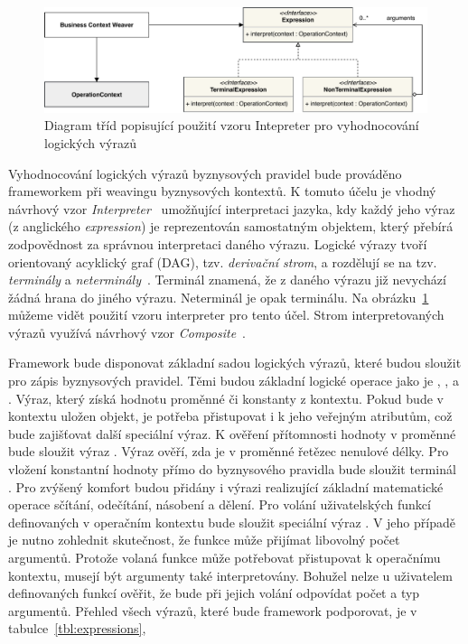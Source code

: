 \begin{figure}
    \centering
    \includegraphics[keepaspectratio=true, width=1\linewidth]{figures/expression.pdf}
    \caption{Diagram tříd popisující použití vzoru Intepreter pro vyhodnocování logických výrazů}
    \label{fig:expression}
\end{figure}

Vyhodnocování logických výrazů byznysových pravidel bude prováděno frameworkem
při weavingu byznysových kontextů. K tomuto účelu je vhodný návrhový vzor
\textit{Interpreter}~\cite{fowler2002patterns} umožňující interpretaci
jazyka, kdy každý jeho výraz (z anglického \textit{expression}) je reprezentován
samostatným objektem, který přebírá zodpovědnost za správnou interpretaci daného výrazu.
Logické výrazy tvoří orientovaný acyklický graf (\gls{DAG}), tzv. \textit{derivační strom},
a rozdělují se na tzv. \textit{terminály} a \textit{neterminály}~\cite{melichar2003jazyky}.
Terminál znamená, že z daného výrazu již nevychází žádná hrana do jiného výrazu. Neterminál je opak terminálu.
Na obrázku~\ref{fig:expression} můžeme vidět použití vzoru interpreter pro tento účel.
Strom interpretovaných výrazů využívá návrhový vzor \textit{Composite}~\cite{fowler2002patterns}.

Framework bude disponovat základní sadou logických výrazů, které budou
sloužit pro zápis byznysových pravidel. Těmi budou základní logické operace jako je
, ,  a . Výraz, který získá hodnotu proměnné
či konstanty z kontextu. Pokud bude v kontextu uložen objekt, je potřeba přistupovat i k jeho
veřejným atributům, což bude zajišťovat další speciální výraz. K ověření přítomnosti hodnoty v proměnné
bude sloužit výraz . Výraz  ověří, zda je v proměnné řetězec
nenulové délky. Pro vložení konstantní hodnoty přímo do byznysového pravidla bude sloužit terminál .
Pro zvýšený komfort budou přidány i výrazi realizující základní matematické operace sčítání, odečítání,
násobení a dělení. Pro volání uživatelských funkcí definovaných v operačním kontextu bude sloužit speciální výraz
. V jeho případě je nutno zohlednit skutečnost, že funkce může přijímat libovolný počet argumentů.
Protože volaná funkce může potřebovat přistupovat k operačnímu kontextu, musejí být argumenty také interpretovány.
Bohužel nelze u uživatelem definovaných funkcí ověřit, že bude při jejich volání odpovídat počet a typ argumentů.
Přehled všech výrazů, které bude framework podporovat, je v tabulce~\ref{tbl:expressions},

